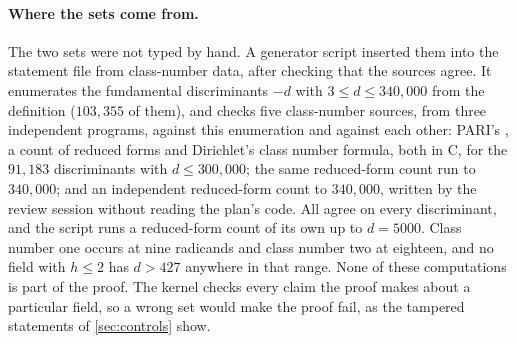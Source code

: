 \documentclass[11pt]{article}
\theoremstyle{definition}
\begin{document}
\paragraph{Where the sets come from.} The two sets were not typed by hand. A generator script inserted them into the statement file from class-number data, after checking that the sources agree. It enumerates the fundamental discriminants $-d$ with $3 \le d \le 340{,}000$ from the definition ($103{,}355$ of them), and checks five class-number sources, from three independent programs, against this enumeration and against each other: PARI's , a count of reduced forms and Dirichlet's class number formula, both in C, for the $91{,}183$ discriminants with $d \le 300{,}000$; the same reduced-form count run to $340{,}000$; and an independent reduced-form count to $340{,}000$, written by the review session without reading the plan's code. All agree on every discriminant, and the script runs a reduced-form count of its own up to $d = 5000$. Class number one occurs at nine radicands and class number two at eighteen, and no field with $h \le 2$ has $d > 427$ anywhere in that range. None of these computations is part of the proof. The kernel checks every claim the proof makes about a particular field, so a wrong set would make the proof fail, as the tampered statements of \cref{sec:controls} show.
\end{document}
